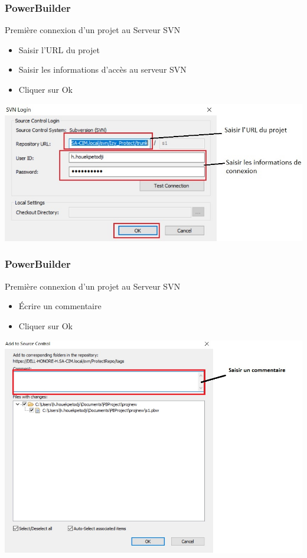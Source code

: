 \documentclass{beamer}
\begin{document}
\begin{frame}
\frametitle{PowerBuilder}
\begin{block}{Première connexion d'un projet au Serveur SVN}
\begin{itemize}
\item Saisir l'URL du projet 
\item Saisir les informations d'accès au serveur SVN
\item Cliquer sur Ok
\end{itemize}
\end{block}
\includegraphics[scale=.5]{../images/connect6.jpg}
\end{frame}

\begin{frame}
\frametitle{PowerBuilder}
\begin{block}{Première connexion d'un projet au Serveur SVN}
\begin{itemize}
\item Écrire un commentaire 
\item Cliquer sur Ok
\end{itemize}
\end{block}
\includegraphics[scale=0.5]{../images/connect7.jpg}
\end{frame}
\end{document}
